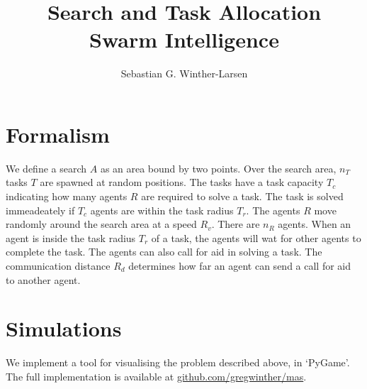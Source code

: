 \documentclass[11pt]{article}
\title{Search and Task Allocation \\
    \small{Swarm Intelligence}}
\author{Sebastian G. Winther-Larsen}
\begin{document}
    
    \maketitle

    \section{Formalism}

    We define a search $A$ as an area bound by two points. Over the search area, 
    $n_T$ tasks $T$ are spawned at random positions. The tasks have a task capacity
    $T_c$ indicating how many agents $R$ are required to solve a task. The task is 
    solved immeadeately if $T_c$ agents are within the task radius $T_r$.
    The agents $R$ move randomly around the search area at a speed $R_v$. There are 
    $n_R$ agents. When an agent is inside the task radius $T_r$ of a task, the agents 
    will wat for other agents to complete the task. The agents can also call for 
    aid in solving a task. The communication distance $R_d$ determines how 
    far an agent can send a call for aid to another agent.
    

    \section{Simulations}

    We implement a tool for visualising the problem described above, in `PyGame'.
    The full implementation is available at \url{github.com/gregwinther/mas}.
\end{document}
